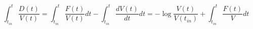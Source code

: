 \begin{equation}
\int_{t_{in}}^t \frac{D(t)}{V(t)}=\int_{t_{in}}^t \frac{F(t)}{V(t)} dt - \int_{t_{in}}^t \frac{dV(t)}{dt} dt = -\log \frac{V(t)}{V(t_{in})}+ \int_{t_{in}}^t \frac{F(t)}{V} dt
\end{equation}